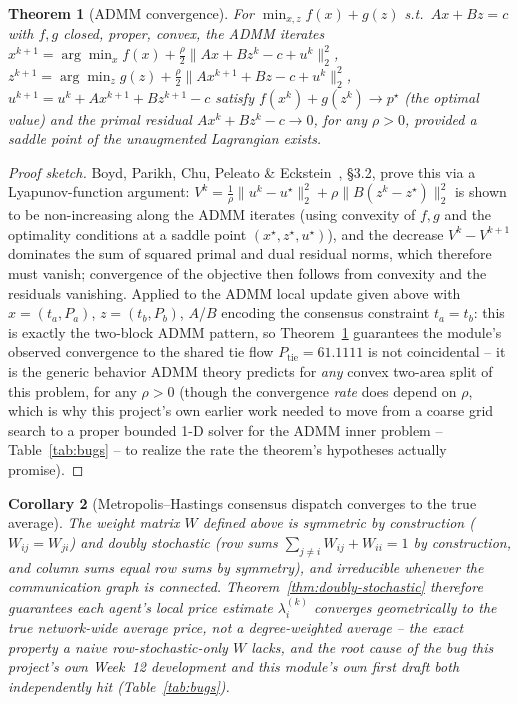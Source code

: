 \documentclass[11pt]{report}
\theoremstyle{plain}
\newtheorem{theorem}{Theorem}[chapter]
\newtheorem{corollary}[theorem]{Corollary}
\theoremstyle{definition}
\theoremstyle{remark}
\begin{document}
\begin{theorem}[ADMM convergence]
\label{thm:admm}
For $\min_{x,z}f(x)+g(z)$ s.t.\ $Ax+Bz=c$ with $f,g$ closed, proper,
convex, the ADMM iterates
$x^{k+1}=\arg\min_xf(x)+\tfrac\rho2\|Ax+Bz^k-c+u^k\|_2^2$,
$z^{k+1}=\arg\min_zg(z)+\tfrac\rho2\|Ax^{k+1}+Bz-c+u^k\|_2^2$,
$u^{k+1}=u^k+Ax^{k+1}+Bz^{k+1}-c$ satisfy $f(x^k)+g(z^k)\to p^\star$
(the optimal value) and the primal residual $Ax^k+Bz^k-c\to0$, for any
$\rho>0$, provided a saddle point of the unaugmented Lagrangian exists.
\end{theorem}
\begin{proof}[Proof sketch]
Boyd, Parikh, Chu, Peleato \& Eckstein~\cite{boyd}, \S3.2, prove this
via a Lyapunov-function argument: $V^k=\tfrac1\rho\|u^k-u^\star\|_2^2+
\rho\|B(z^k-z^\star)\|_2^2$ is shown to be non-increasing along the
ADMM iterates (using convexity of $f,g$ and the optimality conditions at
a saddle point $(x^\star,z^\star,u^\star)$), and the decrease
$V^k-V^{k+1}$ dominates the sum of squared primal and dual residual
norms, which therefore must vanish; convergence of the objective then
follows from convexity and the residuals vanishing. Applied to
the ADMM local update given above with $x=(t_a,P_a)$, $z=(t_b,P_b)$, $A$/$B$ encoding the
consensus constraint $t_a=t_b$: this is exactly the two-block ADMM
pattern, so Theorem~\ref{thm:admm} guarantees the module's observed
convergence to the shared tie flow $P_{\text{tie}}=61.1111$ is not
coincidental -- it is the generic behavior ADMM theory predicts for
\emph{any} convex two-area split of this problem, for any $\rho>0$
(though the convergence \emph{rate} does depend on $\rho$, which is why
this project's own earlier work needed to move from a coarse grid search
to a proper bounded 1-D solver for the ADMM inner problem --
Table~\ref{tab:bugs} -- to realize the rate the theorem's hypotheses
actually promise).
\end{proof}

\begin{corollary}[Metropolis--Hastings consensus dispatch converges to the true average]
\label{cor:mh-dispatch}
The weight matrix $W$ defined above is symmetric by construction
($W_{ij}=W_{ji}$) and doubly stochastic (row sums
$\sum_{j\ne i}W_{ij}+W_{ii}=1$ by construction, and column sums equal row
sums by symmetry), and irreducible whenever the communication graph is
connected. Theorem~\ref{thm:doubly-stochastic} therefore guarantees each
agent's local price estimate $\lambda_i^{(k)}$ converges geometrically to
the true network-wide average price, \emph{not} a degree-weighted
average -- the exact property a naive row-stochastic-only $W$ lacks, and
the root cause of the bug this project's own Week~12 development and
this module's own first draft both independently hit (Table~\ref{tab:bugs}).
\end{corollary}
\end{document}
